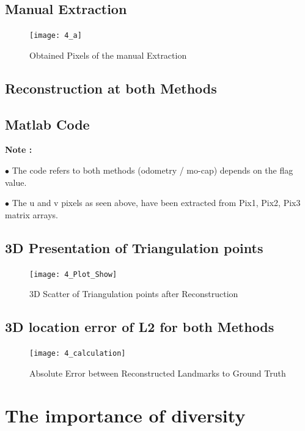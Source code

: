 \documentclass[a4paper]{article}
\begin{document}
\subsection{Manual Extraction}
\begin{figure}[H]
\centering
\texttt{[image: 4\_a]}
\caption{ Obtained Pixels of the manual Extraction } 
\end{figure} \newpage


\subsection{Reconstruction at both Methods }
\subsection*{Matlab Code}



\textbf{Note : }
\begin{flushleft}
$\bullet$ The code refers to both methods (odometry / mo-cap)  depends on the flag value.

$\bullet$ The u and v pixels as seen above, have been extracted from Pix1, Pix2, Pix3 matrix arrays. \end{flushleft} \newpage

\subsection{ 3D Presentation of Triangulation points }


\begin{figure}[H]
\centering
\texttt{[image: 4\_Plot\_Show]}
\caption{ 3D Scatter of Triangulation points after Reconstruction } 
\end{figure}

\subsection{ 3D location error of L2 for both Methods }

\begin{figure}[H]
\centering
\texttt{[image: 4\_calculation]}
\caption{ Absolute Error between Reconstructed Landmarks to Ground Truth } 
\end{figure}
\newpage


\section{The importance of diversity}
\end{document}
